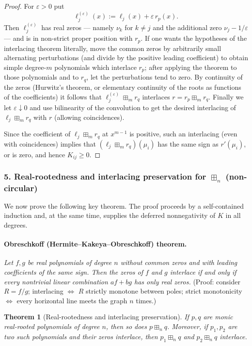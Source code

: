 \documentclass{article}
\newtheorem{theorem}[lemma]{Theorem}
\begin{document}
\begin{proof}
For $\varepsilon > 0$ put
\[
  \ell_j^{(\varepsilon)}(x) := \ell_j(x) + \varepsilon\,r_p(x).
\]
Then $\ell_j^{(\varepsilon)}$ has real zeros --- namely $\nu_k$ for $k \neq j$ and the additional zero $\nu_j - 1/\varepsilon$ --- and is in non-strict proper position with $r_p$. If one wants the hypotheses of the interlacing theorem literally, move the common zeros by arbitrarily small alternating perturbations (and divide by the positive leading coefficient) to obtain simple degree-$m$ polynomials which interlace $r_p$; after applying the theorem to those polynomials and to $r_q$, let the perturbations tend to zero. By continuity of the zeros (Hurwitz's theorem, or elementary continuity of the roots as functions of the coefficients) it follows that $\ell_j^{(\varepsilon)} \boxplus_m r_q$ interlaces $r = r_p \boxplus_m r_q$. Finally we let $\varepsilon \downarrow 0$ and use bilinearity of the convolution to get the desired interlacing of $\ell_j \boxplus_m r_q$ with $r$ (allowing coincidences).

Since the coefficient of $\ell_j \boxplus_m r_q$ at $x^{m-1}$ is positive, such an interlacing (even with coincidences) implies that $(\ell_j \boxplus_m r_q)(\mu_i)$ has the same sign as $r'(\mu_i)$, or is zero, and hence $K_{ij} \ge 0$.
\end{proof}

\subsubsection*{5. Real-rootedness and interlacing preservation for $\boxplus_n$ (non-circular)}

We now prove the following key theorem. The proof proceeds by a self-contained induction and, at the same time, supplies the deferred nonnegativity of $K$ in all degrees.

\paragraph{Obreschkoff (Hermite--Kakeya--Obreschkoff) theorem.}
\textit{Let $f, g$ be real polynomials of degree $n$ without common zeros and with leading coefficients of the same sign. Then the zeros of $f$ and $g$ interlace if and only if every nontrivial linear combination $af + bg$ has only real zeros.}
(Proof: consider $R = f/g$; interlacing $\Leftrightarrow$ $R$ strictly monotone between poles; strict monotonicity $\Leftrightarrow$ every horizontal line meets the graph $n$ times.)

\begin{theorem}[Real-rootedness and interlacing preservation]\label{thm:rr}
If $p, q$ are monic real-rooted polynomials of degree $n$, then so does $p \boxplus_n q$. Moreover, if $p_1, p_2$ are two such polynomials and their zeros interlace, then $p_1 \boxplus_n q$ and $p_2 \boxplus_n q$ interlace.
\end{theorem}
\end{document}
